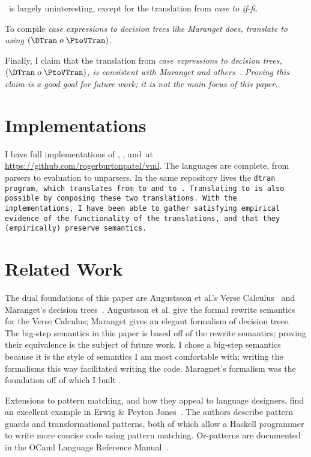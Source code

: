 \documentclass[manuscript,screen,review, 12pt, nonacm]{acmart}
\begin{document}
    \PtoVTran\ is largely uninteresting, except for the translation from
    \it{case} to \it{if-fi}.
        
    To compile \it{case} expressions to decision trees like Maranget does,
    translate \PPlus to \D using $(\DTran\; o\; \PtoVTran)$.
    
    Finally, I claim that the translation from \it{case} expressions to decision
    trees, $(\DTran\; o\; \PtoVTran)$, is consistent with Maranget and
    others~\citep{maranget,scottramsey}. Proving this claim is a good goal for
    future work; it is not the main focus of this paper. 

    \section{Implementations}

    I have full implementations of \PPlus, \VMinus, and~\D at
    \url{https://github.com/rogerburtonpatel/vml}. The languages are complete,
    from parsers to evaluation to unparsers. In the same repository lives the
    \tt{dtran} program, which translates from \PPlus to \VMinus and \VMinus to
    \D. Translating \PPlus to \D is also possible by composing these two
    translations. With the implementations, I have been able to gather
    satisfying empirical evidence of the functionality of the translations, and
    that they (empirically) preserve semantics. 


    \section{Related Work}

    The dual foundations of this paper are Augustsson et al.'s Verse
    Calculus~\citep{verse} and Maranget's decision trees~\citep{maranget}.
    Augustsson et al. give the formal rewrite semantics for the Verse Calculus;
    Maranget gives an elegant formalism of decision trees. The big-step
    semantics in this paper is based off of the rewrite semantics; proving their
    equivalence is the subject of future work. I chose a big-step semantics
    because it is the style of semantics I am most comfortable with; writing the
    formalisms this way facilitated writing the code. Maragnet's formalism was
    the foundation off of which I built \D. 
    
    Extensions to pattern matching, and how they appeal to language designers,
    find an excellent example in Erwig \& Peyton Jones~\citep{guardproposal}.
    The authors describe pattern guards and transformational patterns, both of
    which allow a Haskell programmer to write more concise code using pattern
    matching. Or-patterns are documented in the OCaml Language Reference
    Manual~\citep{ocaml}.
    
\end{document}
